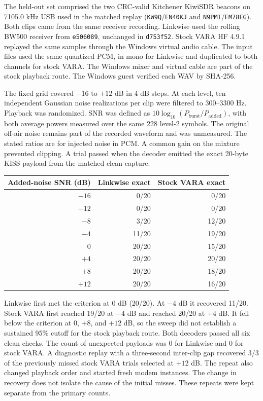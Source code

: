\documentclass[11pt,a4paper]{article}
\begin{document}
The held-out set comprised the two CRC-valid Kitchener KiwiSDR
beacons on 7105.0 kHz USB used in the matched replay
(\texttt{KW9Q}/\texttt{EN40KJ} and \texttt{N9PMI}/\texttt{EM78EG}).
Both clips came from the same receiver recording. Linkwise used the
rolling BW500 receiver from \texttt{e506089}, unchanged in \texttt{d753f52}.
Stock VARA HF 4.9.1 replayed the same samples through the Windows
virtual audio cable. The input files used the same quantized PCM, in mono for Linkwise
and duplicated to both channels for stock VARA. The Windows mixer
and virtual cable are part of the stock playback route.
The Windows guest verified each WAV by SHA-256.

The fixed grid covered $-16$ to $+12$ dB in 4 dB steps. At each level,
ten independent Gaussian noise realizations per clip were filtered to
300--3300 Hz. Playback was randomized. SNR was defined as
$10\log_{10}(P_{\mathrm{burst}}/P_{\mathrm{added}})$, with both average
powers measured over the same 228 level-2 symbols. The original
off-air noise remains part of the recorded waveform and was unmeasured.
The stated ratios are for injected noise in PCM. A common gain on the
mixture prevented clipping. A trial passed when the decoder emitted
the exact 20-byte KISS payload from the matched clean capture.

\begin{center}
\begin{tabular}{@{}rrr@{}}
\toprule
Added-noise SNR (dB) & Linkwise exact & Stock VARA exact \\
\midrule
$-16$ & 0/20 & 0/20 \\
$-12$ & 0/20 & 0/20 \\
$-8$ & 3/20 & 12/20 \\
$-4$ & 11/20 & 19/20 \\
$0$ & 20/20 & 15/20 \\
$+4$ & 20/20 & 20/20 \\
$+8$ & 20/20 & 18/20 \\
$+12$ & 20/20 & 16/20 \\
\bottomrule
\end{tabular}
\end{center}

Linkwise first met the criterion at $0$ dB (20/20). At $-4$ dB it recovered 11/20.
Stock VARA first reached 19/20 at $-4$ dB and reached 20/20 at $+4$ dB.
It fell below the criterion at $0$, $+8$, and $+12$ dB, so the sweep
did not establish a sustained 95\% cutoff for the stock playback route.
Both decoders passed all six clean checks.
The count of unexpected payloads was 0 for Linkwise and 0 for stock VARA.
A diagnostic replay with a three-second inter-clip gap recovered 3/3 of the previously missed stock VARA trials selected at $+12$ dB. The repeat also changed playback order and started fresh modem instances.
The change in recovery does not isolate the cause of the initial misses.
These repeats were kept separate from the primary counts.
\end{document}
